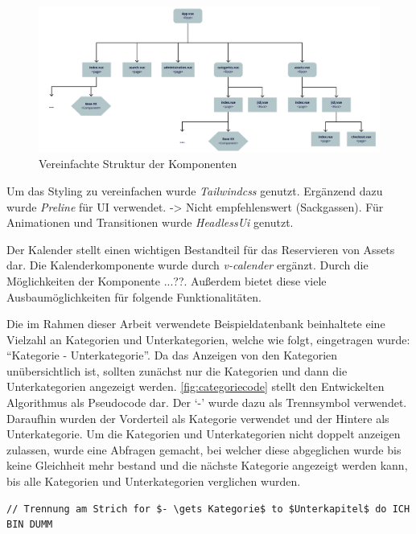 \begin{figure}[h]
  \centering
  \includegraphics[scale=0.5]{Bilder/struktur.pdf}
  \caption[Vereinfachte Struktur der Komponenten]{Vereinfachte Struktur der Komponenten}
  \label{fig:Komponenten}
\end{figure}

Um das Styling zu vereinfachen wurde \textit{Tailwindcss} genutzt. Ergänzend dazu wurde
\textit{Preline} für UI verwendet. -> Nicht empfehlenswert (Sackgassen). Für Animationen und
Transitionen wurde \textit{HeadlessUi} genutzt.

Der Kalender stellt einen wichtigen Bestandteil für das Reservieren von Assets dar. Die
Kalenderkomponente wurde durch \textit{v-calender} ergänzt. Durch die Möglichkeiten der Komponente
...??. Außerdem bietet diese viele Ausbaumöglichkeiten für folgende Funktionalitäten.

Die im Rahmen dieser Arbeit verwendete Beispieldatenbank beinhaltete eine Vielzahl an Kategorien und
Unterkategorien, welche wie folgt, eingetragen wurde: \enquote{Kategorie - Unterkategorie}. Da das
Anzeigen von den Kategorien unübersichtlich ist, sollten zunächst nur die Kategorien und dann die
Unterkategorien angezeigt werden. \ref{fig:categoriecode} stellt den Entwickelten Algorithmus als
Pseudocode dar. Der \enquote*{-} wurde dazu als Trennsymbol verwendet. Daraufhin wurden der
Vorderteil als Kategorie verwendet und der Hintere als Unterkategorie. Um die Kategorien und
Unterkategorien nicht doppelt anzeigen zulassen, wurde eine Abfragen gemacht, bei welcher diese
abgeglichen wurde bis keine Gleichheit mehr bestand und die nächste Kategorie angezeigt werden kann,
bis alle Kategorien und Unterkategorien verglichen wurden.

\begin{lstlisting}[style=pseudo,gobble=2,caption={Pseudocode: Kategorien anzeigen},label=fig:categoriecode]
  // Trennung am Strich for $- \gets Kategorie$ to $Unterkapitel$ do ICH BIN DUMM
\end{lstlisting}


